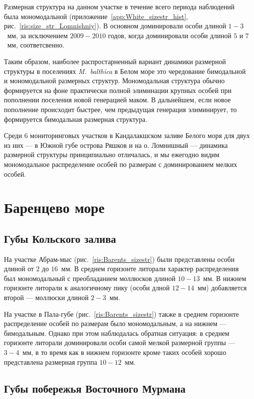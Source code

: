 Размерная структура на данном участке в течение всего периода наблюдений была мономодальной (приложение~\ref{app:White_sizestr_hist}, рис.~\ref{ris:size_str_Lomnishniy}).
В основном доминировали особи длиной $1-3$~мм, за исключением $2009-2010$ годов, когда доминировали особи длиной $5$ и $7$~мм, соответсвенно.


\bigskip
Таким образом, наиболее распростарненный вариант динамики размерной структуры в поселениях {\it M.~balthica} в Белом море это чередование бимодальной и мономодальной размерных структур.
Мономодальная структура обычно формируется на фоне практически полной элиминации крупных особей при пополнении поселения новой генерацией маком.
В дальнейшем, если новое пополнение происходит быстрее, чем предыдущая генерация элиминирует, то формируется бимодальная размерная структура.

Среди 6 мониторинговых участков в Кандалакшском заливе Белого моря для двух из них --- в Южной губе острова Ряшков и на о. Ломнишный --- динамика размерной структуры принципиально отличалась, и мы ежегодно видим мономодальное распределение особей по размерам с доминированием мелких особей.

\afterpage{\clearpage}

		\section{Баренцево море}

		\subsection{Губы Кольского залива}

На участке Абрам-мыс (рис.~\ref{ris:Barents_sizestr}) были представлены особи длиной от $2$ до $16$~мм. 
В среднем горизонте литорали характер распределения был мономодальный с преобладанием моллюсков длиной $10-13$~мм. 
В нижнем горизонте литорали к аналогичному пику (особи длной $12-14$~мм) добавляется второй — моллюски длиной $2-3$~мм.

На участке в Пала-губе (рис.~\ref{ris:Barents_sizestr}) также в среднем горизонте распределение особей по размерам было мономодальным, а на нижнем --- бимодальным. 
Однако при этом наблюдалась обратная ситуация: в среднем горизонте литорали доминировали особи самой мелкой размерной группы --- $3-4$~мм, в то время как  в нижнем горизонте кроме таких особей  хорошо представлена размерная группа $10-12$~мм.

		\subsection{Губы побережья Восточного Мурмана}

